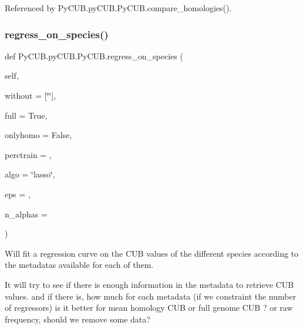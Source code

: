 Referenced by Py\+C\+U\+B.\+py\+C\+U\+B.\+Py\+C\+U\+B.\+compare\+\_\+homologies().

\mbox{\label{class_py_c_u_b_1_1py_c_u_b_1_1_py_c_u_b_af37319783148fc8864d894b3e2f89078}} 
\subsubsection{\texorpdfstring{regress\+\_\+on\+\_\+species()}{regress\_on\_species()}}
{\footnotesize\ttfamily def Py\+C\+U\+B.\+py\+C\+U\+B.\+Py\+C\+U\+B.\+regress\+\_\+on\+\_\+species (\begin{DoxyParamCaption}\item[{}]{self,  }\item[{}]{without = {\ttfamily \mbox{[}\char`\"{}\char`\"{}\mbox{]}},  }\item[{}]{full = {\ttfamily True},  }\item[{}]{onlyhomo = {\ttfamily False},  }\item[{}]{perctrain = {},  }\item[{}]{algo = {\ttfamily \char`\"{}lasso\char`\"{}},  }\item[{}]{eps = {},  }\item[{}]{n\+\_\+alphas = {} }\end{DoxyParamCaption})}



Will fit a regression curve on the C\+UB values of the different species according to the metadatas available for each of them. 

It will try to see if there is enough information in the metadata to retrieve C\+UB values. and if there is, how much for each metadata (if we constraint the number of regressors) is it better for mean homology C\+UB or full genome C\+UB ? or raw frequency, should we remove some data?


